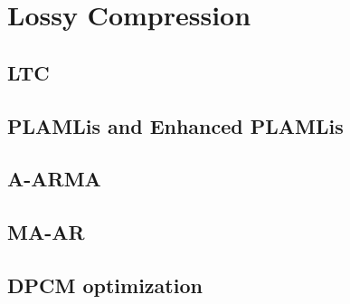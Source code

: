 \section{Lossy Compression}

\subsection{LTC}
\subsection{PLAMLis and Enhanced PLAMLis}

\subsection{A-ARMA}

\subsection{MA-AR}

\subsection{DPCM optimization}
